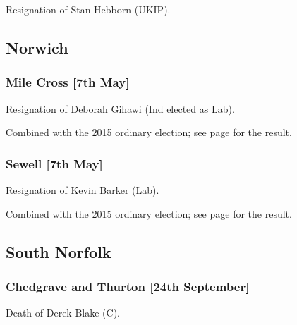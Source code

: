 \documentclass[a4paper,openany]{book}
\begin{document}
\begin{resultsiii}

Resignation of Stan Hebborn (UKIP).

\subsection*{Norwich}

\subsubsection*{Mile Cross \hspace*{\fill}\nolinebreak[1]%
\enspace\hspace*{\fill}
[7th May]}


Resignation of Deborah Gihawi (Ind elected as Lab).

Combined with the 2015 ordinary election; see page \pageref{MileCrossNorwich} for the result.

\subsubsection*{Sewell \hspace*{\fill}\nolinebreak[1]%
\enspace\hspace*{\fill}
[7th May]}


Resignation of Kevin Barker (Lab).

Combined with the 2015 ordinary election; see page \pageref{SewellNorwich} for the result.

\subsection*{South Norfolk}

\subsubsection*{Chedgrave and Thurton \hspace*{\fill}\nolinebreak[1]%
\enspace\hspace*{\fill}
[24th September]}


Death of Derek Blake (C).


\end{resultsiii}
\end{document}
